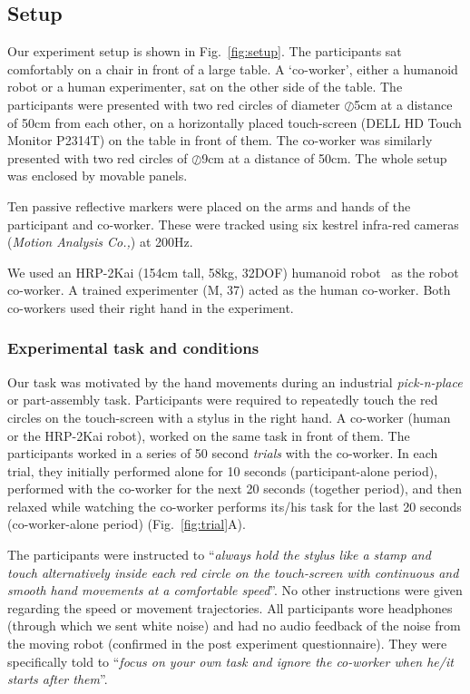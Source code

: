 \subsection{Setup}

Our experiment setup is shown in Fig.~\ref{fig:setup}. The participants sat comfortably on a chair in front of a large table. A `co-worker', either a humanoid robot or a human experimenter, sat on the other side of the table. The participants were presented with two red circles of diameter $\oslash$5cm at a distance of 50cm from each other, on a horizontally placed touch-screen (DELL HD Touch Monitor P2314T) on the table in front of them. The co-worker was similarly presented with two red circles of $\oslash$9cm at a distance of 50cm. The whole setup was enclosed by movable panels.

Ten passive reflective markers were placed on the arms and hands of the participant and co-worker. These were tracked using six kestrel infra-red cameras ({\it Motion Analysis Co.,}) at 200Hz.

We used an HRP-2Kai (154cm tall, 58kg, 32DOF) humanoid robot~\cite{Kaneko:RAS_ICHR:2015} as the robot co-worker. A trained experimenter (M, 37) acted as the human co-worker. Both co-workers used their right hand in the experiment.

\subsubsection{Experimental task and conditions}

Our task was motivated by the hand movements during an industrial {\it pick-n-place} or part-assembly task. Participants were required to repeatedly touch the red circles on the touch-screen with a stylus in the right hand. A co-worker (human or the HRP-2Kai robot), worked on the same task in front of them. The participants worked in a series of 50 second \textit{trials} with the co-worker. In each trial, they initially performed alone for 10 seconds (participant-alone period), performed with the co-worker for the next 20 seconds (together period), and then relaxed while watching the co-worker performs its/his task for the last 20 seconds (co-worker-alone period) (Fig.~\ref{fig:trial}A).

The participants were instructed to ``{\it always hold the stylus like a stamp and touch alternatively inside each red circle on the touch-screen with continuous and smooth hand movements at a comfortable speed}''. No other instructions were given regarding the speed or movement trajectories. All participants wore headphones (through which we sent white noise) and had no audio feedback of the noise from the moving robot (confirmed in the post experiment questionnaire). They were specifically told to ``{\it focus on your own task and ignore the co-worker when he/it starts after them}''.


